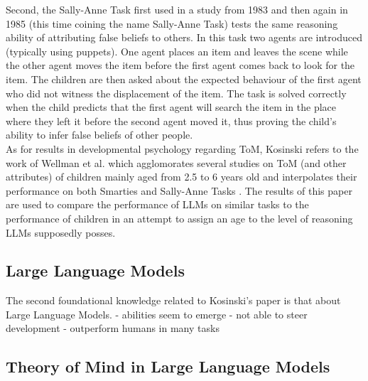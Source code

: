 Second, the Sally-Anne Task first used in a study from 1983 \cite{fb_test_places_1} and then again in 1985 \cite{fb_test_places_2} (this time coining the name Sally-Anne Task) tests the same reasoning ability of attributing false beliefs to others. In this task two agents are introduced (typically using puppets). One agent places an item and leaves the scene while the other agent moves the item before the first agent comes back to look for the item. The children are then asked about the expected behaviour of the first agent who did not witness the displacement of the item. The task is solved correctly when the child predicts that the first agent will search the item in the place where they left it before the second agent moved it, thus proving the child's ability to infer false beliefs of other people. \cite{fb_test_places_1,fb_test_places_2} \\
As for results in developmental psychology regarding ToM, Kosinski refers to the work of Wellman et al. which agglomorates several studies on ToM (and other attributes) of children mainly aged from 2.5 to 6 years old and interpolates their performance on both Smarties and Sally-Anne Tasks \cite{tom_children_2001}. The results of this paper are used to compare the performance of LLMs on similar tasks to the performance of children in an attempt to assign an age to the level of reasoning LLMs supposedly posses.

\subsection{Large Language Models}
The second foundational knowledge related to Kosinski's paper is that about Large Language Models. 
- abilities seem to emerge
- not able to steer development
- outperform humans in many tasks
\subsection{Theory of Mind in Large Language Models}